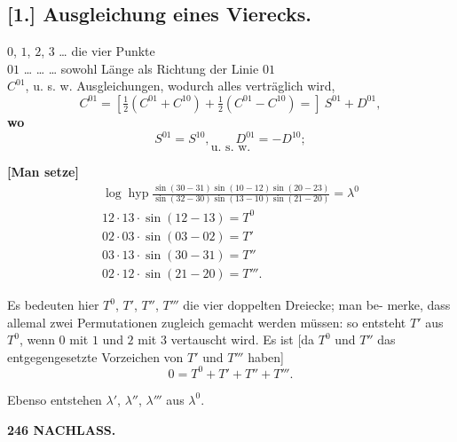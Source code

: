 \documentclass[12pt,a4paper]{article}
\theoremstyle{plain}
\theoremstyle{definition}
\theoremstyle{remark}
\DeclareMathOperator{\hyp}{hyp}
\begin{document}
\subsection*{[1.] Ausgleichung eines Vierecks.}

$0$, $1$, $2$, $3$ \ldots{} die vier Punkte\\
$01$ \ldots{} \ldots{} \ldots{} sowohl L\"ange als Richtung der Linie $01$\\
$C^{01}$, u. s. w. Ausgleichungen, wodurch alles vertr\"aglich wird,
\[
C^{01} = [\tfrac{1}{2}(C^{01} + C^{10}) + \tfrac{1}{2}(C^{01} - C^{10}) =]\ S^{01} + D^{01},
\]
\textbf{wo}
\[
S^{01} = S^{10}, \qquad D^{01} = -D^{10};
\]
\[\text{u. s. w.}\]

\textbf{[Man setze]}
\begin{gather*}
\log \hyp \frac{\sin(30 - 31) \sin(10 - 12) \sin(20 - 23)}{\sin(32 - 30) \sin(13 - 10) \sin(21 - 20)} = \lambda^0\\[4pt]
12 \cdot 13 \cdot \sin(12 - 13) = T^0\\
02 \cdot 03 \cdot \sin(03 - 02) = T'\\
03 \cdot 13 \cdot \sin(30 - 31) = T''\\
02 \cdot 12 \cdot \sin(21 - 20) = T'''.
\end{gather*}

Es bedeuten hier $T^0$, $T'$, $T''$, $T'''$ die vier doppelten Dreiecke; man be-
merke, dass allemal zwei Permutationen zugleich gemacht werden m\"ussen: so
entsteht $T'$ aus $T^0$, wenn $0$ mit $1$ und $2$ mit $3$ vertauscht wird. Es ist [da
$T^0$ und $T''$ das entgegengesetzte Vorzeichen von $T'$ und $T'''$ haben]
\[
0 = T^0 + T' + T'' + T'''.
\]

Ebenso entstehen $\lambda'$, $\lambda''$, $\lambda'''$ aus $\lambda^0$.


\newpage

\noindent\textbf{246 NACHLASS.}
\end{document}
